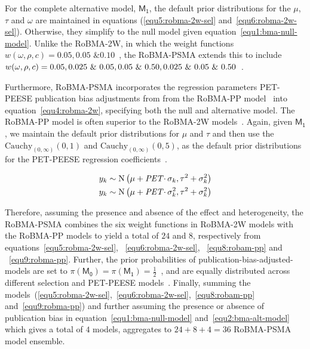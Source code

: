 \documentclass[a4paper, 12pt]{article}
\begin{document}
    For the complete alternative model, $\mathsf{M_1}$, the default prior distributions for the $\mu$, $\tau$ and $\omega$ are maintained in equations (\ref{equ5:robma-2w-sel} and~\ref{equ6:robma-2w-sel}). Otherwise, they simplify to the null model given equation~\ref{equ1:bma-null-model}. Unlike the RoBMA-2W, in which the weight functions $w(\omega, \rho, c) = 0.05, 0.05 \text{ \& } 0.10$~\parencite{maier2022}, the RoBMA-PSMA extends this to include $w(\omega,\rho, c) = 0.05, \break 0.025 \text{ \& } 0.05, 0.05 \text{ \& } 0.50, 0.025 \text{ \& } 0.05\text{ \& }0.50$~\parencite{bartos2022}.

    Furthermore, RoBMA-PSMA incorporates the regression parameters PET-PEESE publication bias adjustments from from the RoBMA-PP model~\parencite{bartos2021, bartos2022} into equation~\ref{equ4:robma-2w}, specifying both the null and alternative model. The RoBMA-PP model is often superior to the RoBMA-2W models~\parencites{kvarven2020,cartermccullough2014,moreno2009}. Again, given $\mathsf{M_1}$, we maintain the default prior distributions for $\mu$ and $\tau$ and then use the $\text{Cauchy}_{(0, \infty)} (0,1)$ and $\text{Cauchy}_{(0, \infty)} (0,5)$, as the default prior distributions for the PET-PEESE regression coefficients~\parencites{bartos2022, stanleydoucouliagos2014}.

    \begin{align}
        y_k & \sim \text{N} \left(\mu+ \text{\textit{PET}} \cdotp \sigma_k, \tau^{2} + \sigma_k^{2} \right) \label{equ8:robam-pp} \\
        y_k & \sim \text{N} \left(\mu+ \text{\textit{PET}} \cdotp \sigma_k^2, \tau^{2} + \sigma_k^{2} \right) \label{equ9:robma-pp}
    \end{align}

    Therefore, assuming the presence and absence of the effect and heterogeneity, the RoBMA-PSMA combines the six weight functions in RoBMA-2W models with the RoBMA-PP models to yield a total of $24$ and $8$, respectively from equations~\ref{equ5:robma-2w-sel}, ~\ref{equ6:robma-2w-sel}, ~\ref{equ8:robam-pp} and ~\ref{equ9:robma-pp}. Further, the prior probabilities of publication-bias-adjusted-models are set to $\pi(\mathsf{M_0}) = \pi(\mathsf{M_1}) = \frac{1}{2}$~\parencite{maier2022}, and are equally distributed across different selection and PET-PEESE models~\parencites{gronau2021, clyde2011, hoeting1999, jeffreys1998}. Finally, summing the models~(\ref{equ5:robma-2w-sel},~\ref{equ6:robma-2w-sel},~\ref{equ8:robam-pp} and~\ref{equ9:robma-pp}) and further assuming the presence or absence of publication bias in equation~\ref{equ1:bma-null-model} and~\ref{equ2:bma-alt-model} which gives a total of $4$ models, aggregates to $24 + 8 + 4 = 36$ RoBMA-PSMA model ensemble.
\end{document}

